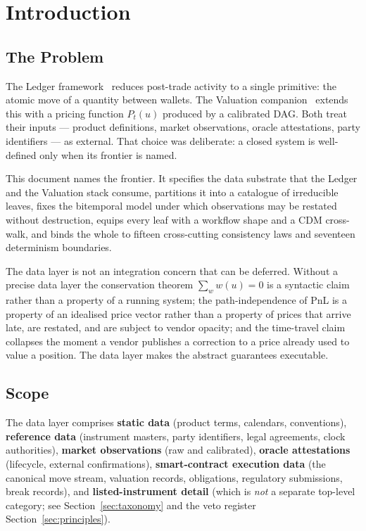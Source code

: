 \documentclass[11pt,a4paper]{article}
\begin{document}
\tableofcontents
\clearpage

\section{Introduction}
\label{sec:intro}

\subsection{The Problem}
\label{sec:intro-problem}

The Ledger framework~\cite{ledger} reduces post-trade activity to a single primitive: the atomic move of a quantity between wallets. The Valuation companion~\cite{valuation} extends this with a pricing function $P_t(u)$ produced by a calibrated DAG. Both treat their inputs --- product definitions, market observations, oracle attestations, party identifiers --- as external. That choice was deliberate: a closed system is well-defined only when its frontier is named.

This document names the frontier. It specifies the data substrate that the Ledger and the Valuation stack consume, partitions it into a catalogue of irreducible leaves, fixes the bitemporal model under which observations may be restated without destruction, equips every leaf with a workflow shape and a CDM cross-walk, and binds the whole to fifteen cross-cutting consistency laws and seventeen determinism boundaries.

The data layer is not an integration concern that can be deferred. Without a precise data layer the conservation theorem $\sum_w w(u) = 0$ is a syntactic claim rather than a property of a running system; the path-independence of PnL is a property of an idealised price vector rather than a property of prices that arrive late, are restated, and are subject to vendor opacity; and the time-travel claim collapses the moment a vendor publishes a correction to a price already used to value a position. The data layer makes the abstract guarantees executable.

\subsection{Scope}
\label{sec:intro-scope}

The data layer comprises \textbf{static data} (product terms, calendars, conventions), \textbf{reference data} (instrument masters, party identifiers, legal agreements, clock authorities), \textbf{market observations} (raw and calibrated), \textbf{oracle attestations} (lifecycle, external confirmations), \textbf{smart-contract execution data} (the canonical move stream, valuation records, obligations, regulatory submissions, break records), and \textbf{listed-instrument detail} (which is \emph{not} a separate top-level category; see Section~\ref{sec:taxonomy} and the veto register Section~\ref{sec:principles}).
\end{document}

